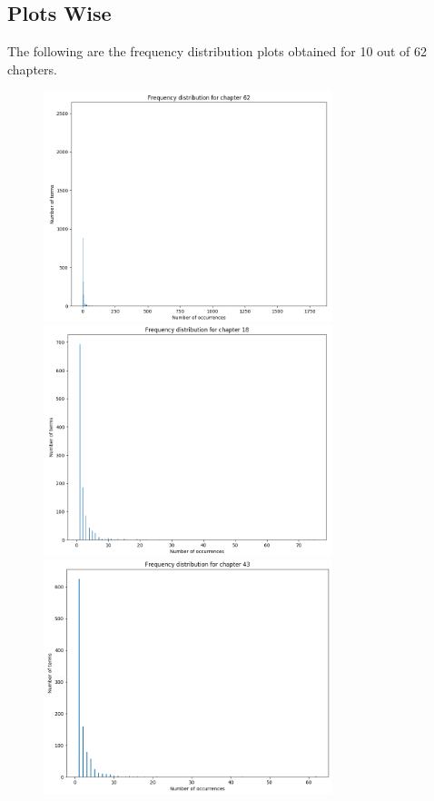 \documentclass{article}
\begin{document}
\subsection{Plots Wise}
\begin{flushleft}
	The following are the frequency distribution plots obtained for 10 out of 62 chapters. 
	\begin{figure}[H]
		\begin{minipage}{0.45\linewidth}
			\centering
			\includegraphics[width=0.75\textwidth]{./images/1-chapter_wise-frequency.png}
			\includegraphics[width=0.75\textwidth]{./images/2-chapter_wise-frequency.png}
			\includegraphics[width=0.75\textwidth]{./images/3-chapter_wise-frequency.png}

\end{minipage}
\end{figure}
\end{flushleft}
\end{document}
